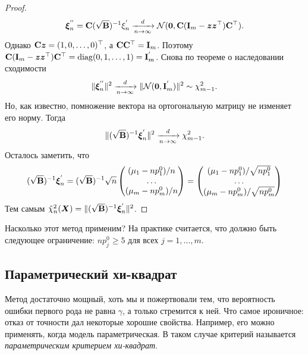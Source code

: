 \begin{proof}
	\begin{equation}
		\bm{\xi}_{n}^{''} = \mathbf{C}(\sqrt{\mathbf{B}})^{-1}\xi_{n}^{'} \xrightarrow[n \to \infty]{d} \mathcal{N}(\bm{0}, \mathbf{C}(\mathbf{I}_{m} - \bm{z}\bm{z}^{\top})\mathbf{C}^{\top}).
	\end{equation}
	Однако $\mathbf{C}\bm{z} = (1, 0, \ldots, 0)^{\top}$, а $\mathbf{C}\mathbf{C}^{\top} = \mathbf{I}_{m}$. Поэтому $\mathbf{C}(\mathbf{I}_{m} - \bm{z}\bm{z}^{\top})\mathbf{C}^{\top} = \operatorname{diag}(0, 1, \ldots, 1) = \mathbf{I}^{'}_{m}$. Снова по теореме о наследовании сходимости
	\begin{equation}
		\|\bm{\xi}_{n}^{''}\|^{2} \xrightarrow[n \to \infty]{d} \|\mathcal{N}(\bm{0}, \mathbf{I}^{'}_{m})\|^{2} \sim \chi^{2}_{m - 1}.
	\end{equation}
	Но, как известно, помножение вектора на ортогональную матрицу не изменяет его норму. Тогда
	\begin{equation}
		\|(\sqrt{\mathbf{B}})^{-1}\bm{\xi}_{n}^{'}\|^{2} \xrightarrow[n \to \infty]{d} \chi^{2}_{m - 1}.
	\end{equation}
	Осталось заметить, что
	\begin{equation}
		(\sqrt{\mathbf{B}})^{-1}\bm{\xi}_{n}^{'}
		= (\sqrt{\mathbf{B}})^{-1}\sqrt{n}\begin{pmatrix}
			(\mu_{1} - np_{1}^{0})/n \\ \ldots  \\ (\mu_{m} - np_{m}^{0})/n
		\end{pmatrix}
		= \begin{pmatrix}
			(\mu_{1} - np_{1}^{0})/\sqrt{np_{1}^{0}} \\ \ldots  \\ (\mu_{m} - np_{m}^{0})/\sqrt{np_{m}^{0}}
		\end{pmatrix}
	\end{equation}
	Тем самым $\hat{\chi}^{2}_{n}(\bm{X}) = \|(\sqrt{\mathbf{B}})^{-1}\bm{\xi}_{n}^{'}\|^{2}$.
\end{proof}
Насколько этот метод применим? На практике считается, что должно быть следующее ограничение: $np_{j}^{0} \geq 5$ для всех $j = 1, \ldots, m$. 

\subsection{Параметрический хи-квадрат}
Метод достаточно мощный, хоть мы и пожертвовали тем, что вероятность ошибки первого рода не равна $\gamma$, а только стремится к ней. Что самое ироничное: отказ от точности дал некоторые хорошие свойства. Например, его можно применять, когда модель параметрическая. В таком случае критерий называется \emph{параметрическим критерием хи-квадрат}.

